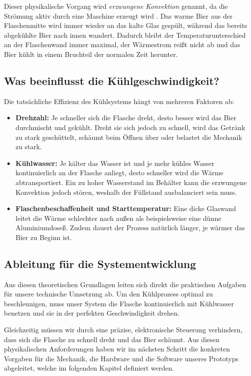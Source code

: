 Dieser physikalische Vorgang wird \textit{erzwungene Konvektion} genannt, da die Strömung aktiv durch eine Maschine erzeugt wird \cite[vgl. S. 73]{Böckh}. Das warme Bier aus der Flaschenmitte wird immer wieder an das kalte Glas gespült, während das bereits abgekühlte Bier nach innen wandert. Dadurch bleibt der Temperaturunterschied an der Flaschenwand immer maximal, der Wärmestrom reißt nicht ab und das Bier kühlt in einem Bruchteil der normalen Zeit herunter.

\subsection{Was beeinflusst die Kühlgeschwindigkeit?}
Die tatsächliche Effizienz des Kühlsystems hängt von mehreren Faktoren ab:
\begin{itemize}
	\item \textbf{Drehzahl:} Je schneller sich die Flasche dreht, desto besser wird das Bier durchmischt und gekühlt. Dreht sie sich jedoch zu schnell, wird das Getränk zu stark geschüttelt, schäumt beim Öffnen über oder belastet die Mechanik zu stark.
	\item \textbf{Kühlwasser:} Je kälter das Wasser ist und je mehr kühles Wasser kontinuierlich an der Flasche anliegt, desto schneller wird die Wärme abtransportiert. Ein zu hoher Wasserstand im Behälter kann die erzwungene Konvektion jedoch stören, weshalb der Füllstand ausbalanciert sein muss.
	\item \textbf{Flaschenbeschaffenheit und Starttemperatur:} Eine dicke Glaswand leitet die Wärme schlechter nach außen als beispielsweise eine dünne Aluminiumdoseß. Zudem dauert der Prozess natürlich länger, je wärmer das Bier zu Beginn ist.
\end{itemize}

\subsection{Ableitung für die Systementwicklung}
Aus diesen theoretischen Grundlagen leiten sich direkt die praktischen Aufgaben für unsere technische Umsetzung ab. Um den Kühlprozess optimal zu beschleunigen, muss unser System die Flasche kontinuierlich mit Kühlwasser benetzen und sie in der perfekten Geschwindigkeit drehen. 

Gleichzeitig müssen wir durch eine präzise, elektronische Steuerung verhindern, dass sich die Flasche zu schnell dreht und das Bier schäumt. Aus diesen physikalischen Anforderungen haben wir im nächsten Schritt die konkreten Vorgaben für die Mechanik, die Hardware und die Software unseres Prototyps abgeleitet, welche im folgenden Kapitel definiert werden.